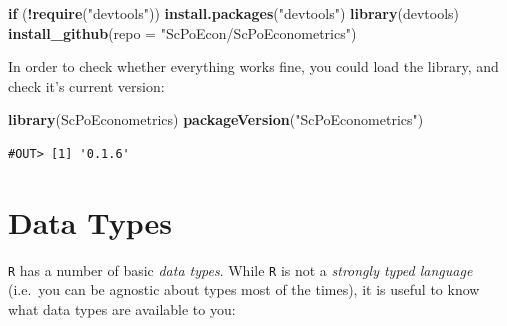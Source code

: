 \documentclass[]{book}
\newenvironment{Shaded}{\begin{snugshade}}{\end{snugshade}}
\newcommand{\KeywordTok}[1]{\textcolor[rgb]{0.13,0.29,0.53}{\textbf{#1}}}
\newcommand{\DataTypeTok}[1]{\textcolor[rgb]{0.13,0.29,0.53}{#1}}
\newcommand{\StringTok}[1]{\textcolor[rgb]{0.31,0.60,0.02}{#1}}
\newcommand{\ControlFlowTok}[1]{\textcolor[rgb]{0.13,0.29,0.53}{\textbf{#1}}}
\newcommand{\OperatorTok}[1]{\textcolor[rgb]{0.81,0.36,0.00}{\textbf{#1}}}
\newcommand{\NormalTok}[1]{#1}
\theoremstyle{definition}
\theoremstyle{definition}
\theoremstyle{definition}
\theoremstyle{remark}
\begin{document}
\begin{Shaded}
\begin{Highlighting}[]
\ControlFlowTok{if}\NormalTok{ (}\OperatorTok{!}\KeywordTok{require}\NormalTok{(}\StringTok{"devtools"}\NormalTok{)) }\KeywordTok{install.packages}\NormalTok{(}\StringTok{"devtools"}\NormalTok{)}
\KeywordTok{library}\NormalTok{(devtools)}
\KeywordTok{install_github}\NormalTok{(}\DataTypeTok{repo =} \StringTok{"ScPoEcon/ScPoEconometrics"}\NormalTok{)}
\end{Highlighting}
\end{Shaded}

In order to check whether everything works fine, you could load the
library, and check it's current version:

\begin{Shaded}
\begin{Highlighting}[]
\KeywordTok{library}\NormalTok{(ScPoEconometrics)}
\KeywordTok{packageVersion}\NormalTok{(}\StringTok{"ScPoEconometrics"}\NormalTok{)}
\end{Highlighting}
\end{Shaded}

\begin{verbatim}
#OUT> [1] '0.1.6'
\end{verbatim}

\section{Data Types}\label{data-types}

\texttt{R} has a number of basic \emph{data types}. While \texttt{R} is
not a \emph{strongly typed language} (i.e.~you can be agnostic about
types most of the times), it is useful to know what data types are
available to you:
\end{document}
